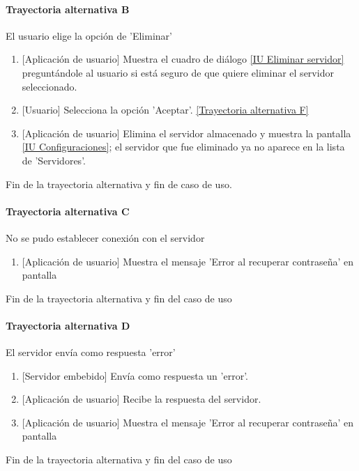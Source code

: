 \paragraph{Trayectoria alternativa B} \label{SUB-U-CU1.9:TB}
	El usuario elige la opción de 'Eliminar'
	\begin{enumerate}[label=A\arabic*.]
		\item {[Aplicación de usuario]} Muestra el cuadro de diálogo \hyperref[fig:Eliminar servidor]{[IU Eliminar servidor]} preguntándole al usuario si está seguro de que quiere eliminar el servidor seleccionado.
		\item {[Usuario]} Selecciona la opción 'Aceptar'. \hyperref[SUB-U-CU1.9:TF]{[Trayectoria alternativa F]}
		\item {[Aplicación de usuario]} Elimina el servidor almacenado y muestra la pantalla \hyperref[fig:Configuraciones]{[IU Configuraciones]}; el servidor que fue eliminado ya no aparece en la lista de 'Servidores'.
	\end{enumerate}
	Fin de la trayectoria alternativa y fin de caso de uso.
	
\paragraph{Trayectoria alternativa C} \label{SUB-U-CU1.9:TC}
    No se pudo establecer conexión con el servidor
    \begin{enumerate}[label=D\arabic*.]
		\item {[Aplicación de usuario]} Muestra el mensaje 'Error al recuperar contraseña' en pantalla
	\end{enumerate}
	Fin de la trayectoria alternativa y fin del caso de uso

\paragraph{Trayectoria alternativa D} \label{SUB-U-CU1.9:TD}
    El servidor envía como respuesta 'error'
    \begin{enumerate}[label=D\arabic*.]
		\item {[Servidor embebido]} Envía como respuesta un 'error'.
		\item {[Aplicación de usuario]} Recibe la respuesta del servidor.
		\item {[Aplicación de usuario]} Muestra el mensaje 'Error al recuperar contraseña' en pantalla
	\end{enumerate}
	Fin de la trayectoria alternativa y fin del caso de uso
	
